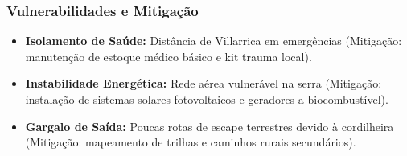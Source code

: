 \subsubsection{Vulnerabilidades e
Mitigação}

\begin{itemize}
\tightlist
\item
  \textbf{Isolamento de Saúde:} Distância de Villarrica em emergências
  (Mitigação: manutenção de estoque médico básico e kit trauma local).
\item
  \textbf{Instabilidade Energética:} Rede aérea vulnerável na serra
  (Mitigação: instalação de sistemas solares fotovoltaicos e geradores a
  biocombustível).
\item
  \textbf{Gargalo de Saída:} Poucas rotas de escape terrestres devido à
  cordilheira (Mitigação: mapeamento de trilhas e caminhos rurais
  secundários).
\end{itemize}

